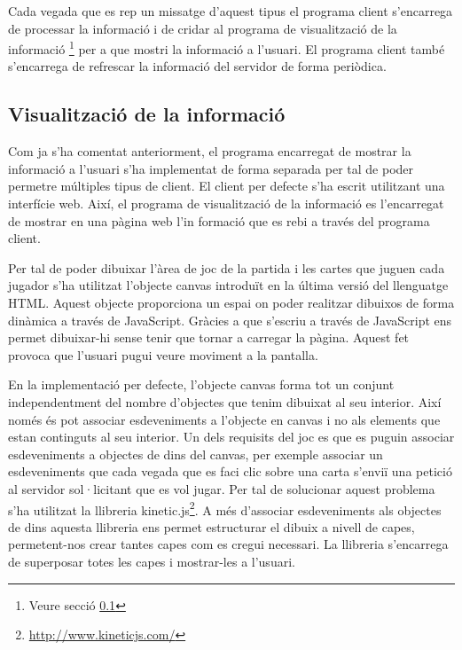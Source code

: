 Cada vegada que es rep un missatge d'aquest tipus el programa client s'encarrega de processar la informació i de cridar al programa de visualització de la informació \footnote{Veure secció \ref{sec:visualitzacio-informacio}} per a que mostri la informació a l'usuari. El programa client també s'encarrega de refrescar la informació del servidor de forma periòdica. 



\subsection{Visualització de la informació}
\label{sec:visualitzacio-informacio}

Com ja s'ha comentat anteriorment, el programa encarregat de mostrar la informació a l'usuari s'ha implementat de forma separada per tal de poder permetre múltiples tipus de client. El client per defecte s'ha escrit utilitzant una interfície web. Així, el programa de visualització de la informació es l'encarregat de mostrar en una pàgina web l'in formació que es rebi a través del programa client.

Per tal de poder dibuixar l'àrea de joc de la partida i les cartes que juguen cada jugador s'ha utilitzat l'objecte canvas introduït en la última versió del llenguatge HTML. Aquest objecte proporciona un espai on poder realitzar dibuixos de forma dinàmica a través de JavaScript. Gràcies a que s'escriu a través de JavaScript ens permet dibuixar-hi sense tenir que tornar a carregar la pàgina. Aquest fet provoca que l'usuari pugui veure moviment a la pantalla. 

En la implementació per defecte, l'objecte canvas forma tot un conjunt independentment del nombre d'objectes que tenim dibuixat al seu interior. Així només és pot associar esdeveniments a l'objecte en canvas i no als elements que estan continguts al seu interior. Un dels requisits del joc es que es puguin associar esdeveniments a objectes de dins del canvas, per exemple associar un esdeveniments que cada vegada que es faci clic sobre una carta s'enviï una petició al servidor sol·licitant que es vol jugar. Per tal de solucionar aquest problema s'ha utilitzat la llibreria kinetic.js\footnote{\url{http://www.kineticjs.com/}}. A més d'associar esdeveniments als objectes de dins aquesta llibreria ens permet estructurar el dibuix a nivell de capes, permetent-nos crear tantes capes com es cregui necessari. La llibreria s'encarrega de superposar totes les capes i mostrar-les a l'usuari. 

